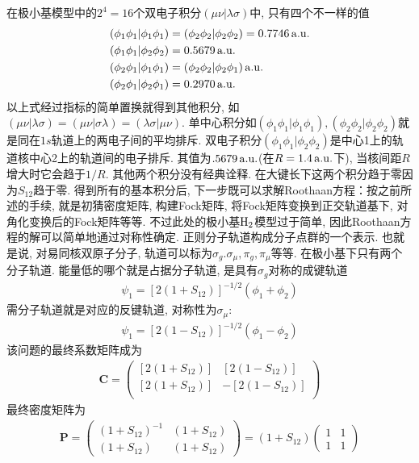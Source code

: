 在极小基模型中的$2^4=16$个双电子积分$(\mu\nu|\lambda\sigma)$中, 只有四个不一样的值
\begin{equation}
\begin{split}
(\phi_1\phi_1|\phi_1\phi_1) & = (\phi_2\phi_2|\phi_2\phi_2) = 0.7746\,\mathrm{a.u.}\\
(\phi_1\phi_1|\phi_2\phi_2) & =0.5679\,\mathrm{a.u.}\\
(\phi_2\phi_1|\phi_1\phi_1) & =(\phi_2\phi_2|\phi_2\phi_1)\,\mathrm{a.u.}\\
(\phi_2\phi_1|\phi_2\phi_1) & =0.2970\,\mathrm{a.u.}
\end{split}
\end{equation}
以上式经过指标的简单置换就得到其他积分, 如$(\mu\nu|\lambda\sigma)=(\mu\nu|\sigma\lambda)=(\lambda\sigma|\mu\nu)$. 单中心积分如$(\phi_1\phi_1|\phi_1\phi_1),(\phi_2\phi_2|\phi_2\phi_2)$就是同在$1s$轨道上的两电子间的平均排斥. 双电子积分$(\phi_1\phi_1|\phi_2\phi_2)$是中心1上的轨道核中心2上的轨道间的电子排斥. 其值为$.5679\,\mathrm{a.u.}$(在$R=1.4\,\mathrm{a.u.}$下), 当核间距$R$增大时它会趋于$1/R$. 其他两个积分没有经典诠释. 在大键长下这两个积分趋于零因为$S_{12}$趋于零. 得到所有的基本积分后, 下一步既可以求解Roothaan方程：按之前所述的手续, 就是初猜密度矩阵, 构建Fock矩阵, 将Fock矩阵变换到正交轨道基下, 对角化变换后的Fock矩阵等等. 不过此处的极小基$\mathrm{H}_2$模型过于简单, 因此Roothaan方程的解可以简单地通过对称性确定. 正则分子轨道构成分子点群的一个表示. 也就是说, 对易同核双原子分子, 轨道可以标为$\sigma_g.\sigma_\mu,\pi_g,\pi_\mu$等等. 在极小基下只有两个分子轨道. 能量低的哪个就是占据分子轨道, 是具有$\sigma_g$对称的成键轨道
\begin{align}
\psi_1 = [2(1+S_{12})]^{-1/2}(\phi_1+\phi_2)
\end{align}
需分子轨道就是对应的反键轨道, 对称性为$\sigma_\mu$:
\begin{align}
\psi_1 = [2(1-S_{12})]^{-1/2}(\phi_1-\phi_2)
\end{align}
该问题的最终系数矩阵成为
\begin{align}
\mathbf{C}=
\begin{pmatrix}
[2(1+S_{12})]&[2(1-S_{12})]\\
[2(1+S_{12})]&-[2(1-S_{12})]\\
\end{pmatrix}
\end{align}
最终密度矩阵为
\begin{align}
\mathbf{P}=
\begin{pmatrix}
(1+S_{12})^{-1} & (1+S_{12})\\(1+S_{12})&(1+S_{12})
\end{pmatrix}
=(1+S_{12})
\begin{pmatrix}
1&1\\1&1
\end{pmatrix}
\end{align}
